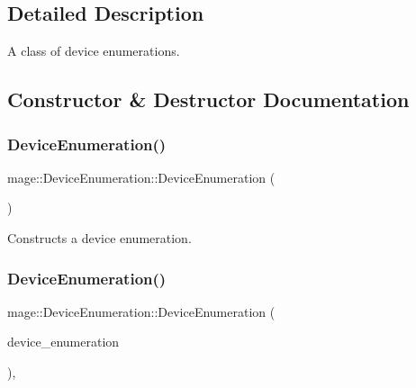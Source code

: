 \subsection{Detailed Description}
A class of device enumerations. 

\subsection{Constructor \& Destructor Documentation}
\hypertarget{classmage_1_1_device_enumeration_aa000048648beb6c2aca70e5ef04e0da2}{}\label{classmage_1_1_device_enumeration_aa000048648beb6c2aca70e5ef04e0da2} 
\subsubsection{\texorpdfstring{Device\+Enumeration()}{DeviceEnumeration()}\hspace{0.1cm}{\footnotesize\ttfamily [1/3]}}
{\footnotesize\ttfamily mage\+::\+Device\+Enumeration\+::\+Device\+Enumeration (\begin{DoxyParamCaption}{ }\end{DoxyParamCaption})\hspace{0.3cm}{\ttfamily [private]}}

Constructs a device enumeration. \hypertarget{classmage_1_1_device_enumeration_a90f3dc13cfb413aa8a2a49a31bcb6ae3}{}\label{classmage_1_1_device_enumeration_a90f3dc13cfb413aa8a2a49a31bcb6ae3} 
\subsubsection{\texorpdfstring{Device\+Enumeration()}{DeviceEnumeration()}\hspace{0.1cm}{\footnotesize\ttfamily [2/3]}}
{\footnotesize\ttfamily mage\+::\+Device\+Enumeration\+::\+Device\+Enumeration (\begin{DoxyParamCaption}\item[{const \hyperlink{classmage_1_1_device_enumeration}{Device\+Enumeration} \&}]{device\+\_\+enumeration }\end{DoxyParamCaption})\hspace{0.3cm}{\ttfamily [private]}, {\ttfamily [delete]}}


